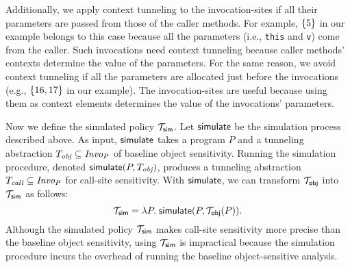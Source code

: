 Additionally, we apply context tunneling to the invocation-sites if all their parameters are passed from those of the caller methods. 
For example, $\{ 5 \}$ in our example
belongs to this case because all the parameters (i.e., \texttt{this} and \texttt{v}) come from the caller. 
Such invocations need context tunneling because caller methods' contexts determine the value of the parameters.
For the same reason, we avoid context tunneling if all the parameters
are allocated just before the invocations (e.g., $\{ 16, 17 \}$ in
our example). The invocation-sites are useful because using them as context elements determines the value of the invocations' parameters.






Now we define the simulated policy $\mathcal{T}_{{\sf sim}}$. 
Let ${\sf simulate}$ be the simulation process described above. 
As input, ${\sf simulate}$ takes a program $P$ and a tunneling abstraction
$T_{\text{\it obj}} \subseteq \text{\it Invo}_P$ of baseline object sensitivity.  
Running the simulation procedure, denoted ${\sf simulate}(P, T_{\text{\it obj}})$, produces a tunneling abstraction $T_{\text{\it call}} \subseteq
\text{\it Invo}_P$ for call-site sensitivity.  
With ${\sf simulate}$, we can transform $\mathcal{T}_{{\sf obj}}$ into
$\mathcal{T}_{{\sf sim}}$ as follows:
\begin{equation}\label{eq:simheuristic}
  \mathcal{T}_{{\sf sim}} = \lambda P.\; {\sf simulate}(P,
  \mathcal{T}_{{\sf obj}}(P)).
\end{equation}
Although the simulated policy $\mathcal{T}_{{\sf sim}}$ makes call-site
sensitivity more precise than the baseline object sensitivity, using
$\mathcal{T}_{{\sf sim}}$  is
impractical because the simulation procedure incurs the overhead of running the baseline object-sensitive analysis.






